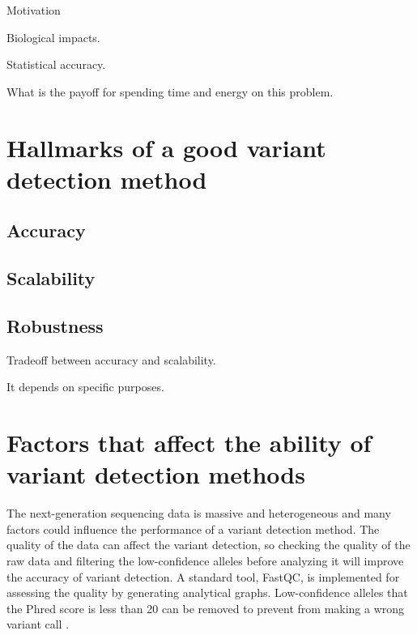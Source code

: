 \documentclass[11pt,reqno]{amsart}
\begin{document}
Motivation

Biological impacts.

Statistical accuracy.

What is the payoff for spending time and energy on this problem.




\section{Hallmarks of a good variant detection method}
\subsection{Accuracy}

\subsection{Scalability}

\subsection{Robustness}

Tradeoff between accuracy and scalability.

It depends on specific purposes.

\section{Factors that affect the ability of variant detection methods}
The next-generation sequencing data is massive and heterogeneous and many factors could influence the performance of a variant detection method.
The quality of the data can affect the variant detection, so checking the quality of the raw data and filtering the low-confidence alleles before analyzing it will improve the accuracy of variant detection.
A standard tool, FastQC, is implemented for assessing the quality by generating analytical graphs.
Low-confidence alleles that the Phred score is less than 20 can be removed to prevent from making a wrong variant call \citep{}.
\end{document}

